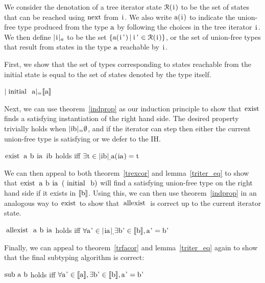 \documentclass[a4paper,english]{lipics-v2019}
\newcommand{\denotes}[1]{\llbracket #1 \rrbracket}
\renewcommand{\c}[1]{\ensuremath{\text{\lstinline{#1}}}\xspace}
\begin{document}
\newcommand{\irdn}[1]{\ensuremath{\mathcal{R}(\c{#1})}}
\newcommand{\irch}[2]{\ensuremath{|\c{#1}|_{#2}}}
We consider the denotation of a tree iterator state $\irdn{i}$ to be the set
of states that can be reached using \c{next} from \c{i}. We also write $\c
a(\c{i})$ to indicate the union-free type produced from the type \c a by
following the choices in the tree iterator \c{i}. We then define \irch{i}{a} to
be the set $\{ \c a(\c{i'}) \,|\, \c{i'} \in \irdn{i} \}$, or the set of union-free
types that result from states in the type \c a reachable by \c{i}.

First, we show that the set of types corresponding to states reachable from
the initial state is equal to the  set of states denoted by the type itself.

\begin{lemma}\label{triter_eq}
$\irch{initial a} = \denotes{\c a}$    
\end{lemma}

Next, we can use theorem~\ref{indprop} as our induction principle to show that
\c{exist} finds a satisfying instantiation of the right hand side. The desired
property trivially holds when $\irch{ib} = \emptyset$, and if the iterator can
step then either the current union-free type is satisfying or we defer to the
IH.

\begin{theorem}\label{trexcor}
\c{exist a b ia ib} holds iff $\exists \c t \in \irch{ib}, \c a(\c{ia}) = \c t$
\end{theorem}

We can then appeal to both theorem~\ref{trexcor} and lemma~\ref{triter_eq} to show
that \c{exist a b ia (initial b)} will find a satisfying union-free type on the right
hand side if it exists in $\denotes{\c b}$. Using this, we can then use theorem~\ref{indprop}
in an analogous way to \c{exist} to show that \c{allexist} is correct up to the current 
iterator state.

\begin{theorem}\label{trfacor}
\c{allexist a b ia} holds iff $\forall \c{a'} \in \irch{ia}, \exists \c{b'} \in \denotes{\c b}, \c{a'} = \c{b'}$
\end{theorem}

Finally, we can appeal to theorem~\ref{trfacor} and lemma~\ref{triter_eq} again to show
that the final subtyping algorithm is correct:

\begin{theorem}\label{trsub}
\c{sub a b} holds iff $\forall \c{a'} \in \denotes{\c a}, \exists \c{b'} \in \denotes{\c b}, \c{a'} = \c{b'}$
\end{theorem}
\end{document}

